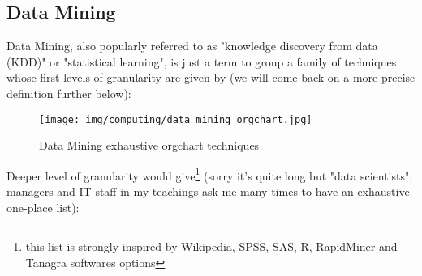	\subsection{Data Mining}
	Data Mining, also popularly referred to as "knowledge discovery from data (KDD)"  or "statistical learning", is just a term to group a family of techniques whose first levels of granularity are given by (we will come back on a more precise definition further below):
	\begin{figure}[H]
		\centering
		\texttt{[image: img/computing/data\_mining\_orgchart.jpg]}
		\caption{Data Mining exhaustive orgchart techniques}
	\end{figure}
	Deeper level of granularity would give\footnote{this list is strongly inspired by Wikipedia, SPSS, SAS, R, RapidMiner and Tanagra softwares options} (sorry it's quite long but "data scientists", managers and IT staff in my teachings ask me many times to have an exhaustive one-place list):
